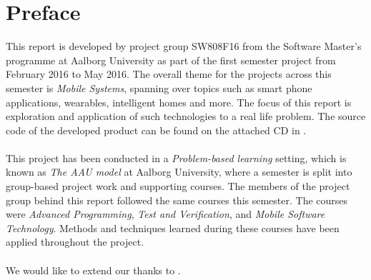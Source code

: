 
\chapter*{Preface}
This report is developed by project group SW808F16 from the Software Master's programme at Aalborg University as part of the first semester project from February 2016 to May 2016. The overall theme for the projects across this semester is \emph{Mobile Systems}, spanning over topics such as smart phone applications, wearables, intelligent homes and more. The focus of this report is exploration and application of such technologies to a real life problem. The source code of the developed product can be found on the attached CD in .
\\\\
This project has been conducted in a \emph{Problem-based learning} setting, which is known as \emph{The AAU model} at Aalborg University, where a semester is split into group-based project work and supporting courses. The members of the project group behind this report followed the same courses this semester. The courses were \emph{Advanced Programming}, \emph{Test and Verification}, and \emph{Mobile Software Technology}. Methods and techniques learned during these courses have been applied throughout the project.
\\\\
We would like to extend our thanks to .







